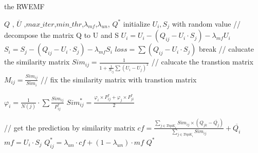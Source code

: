 \begin{algorithm}  
\caption{the RWEMF}  
\label{alg_RWEMF}  
\begin{algorithmic}
\REQUIRE $Q$ , $\overline{U}$ ,$max\_iter$,$min\_thr$,$\lambda_{mf}$,$\lambda_{un}$,
\ENSURE $Q^{*}$
\STATE initialize $U_{i},S_{j}$ with random value
\STATE // decompose the matrix Q to U and S
    \STATE $U_{i} =U_{i}-(Q_{ij}-U_{i} \cdot S_{j}) -\lambda_{mf} U_{i}$
    \STATE $S_{i} =S_{j}-(Q_{ij}-U_{i} \cdot S_{j}) -\lambda_{mf} S_{i}$
    \STATE $loss=\sum{(Q_{ij}-U_{i} \cdot S_{j})}$
        \STATE break
    \ENDIF 
\ENDFOR
\STATE // calucate the similarity matrix 
        \STATE $Sim_{ij}=\frac{1}{1+\frac{1}{N_{ij}}\sum{(U_{i}-U_{j})^2}}$
    \ENDFOR
\ENDFOR
\STATE // calucate the transtion matrix 
        \STATE $M_{ij}=\frac{Sim_{ij}}{Sim_{i}}$
    \ENDFOR
\ENDFOR
\STATE // fix the similarity matrix with transtion matrix

        \STATE $\varphi_{i}=\frac{1}{N(j)} \cdot \sum{\frac{Sim_{ij}}{P^{*}_{ij}}} $    
        \STATE $Sim_{ij}^{*}=\frac
{\varphi_{i} \times P^{*}_{ij} + \varphi_{j} \times P^{*}_{ji}
}{2}$
    \ENDFOR
\ENDFOR

\STATE // get the prediction by similarity matrix
        \STATE $cf=\frac{
  \sum_{j \in TopK_{i}}{Sim_{ij} \times (Q_{jk}-\overline{Q_{j}})}
  }{
  \sum_{j \in TopK_{i}}{Sim_{ij}}
}+\overline{Q_{i}} $    
        \STATE $mf= U_{i} \cdot S_{j}$
        \STATE $Q_{ij}^{*}= \lambda_{un} \cdot cf + (1-\lambda_{un}) \cdot mf$
    \ENDFOR
\ENDFOR
\RETURN $Q^{*}$

\end{algorithmic}  
\end{algorithm}  